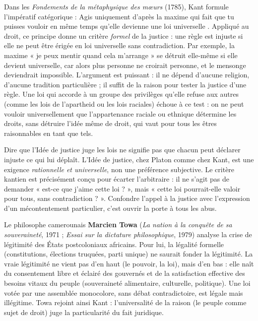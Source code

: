 \documentclass[11pt]{article}
\begin{document}
\begin{propriete}
Dans les \emph{Fondements de la métaphysique des mœurs} (1785), Kant formule l'impératif catégorique : \guillemotleft Agis uniquement d'après la maxime qui fait que tu puisses vouloir en même temps qu'elle devienne une loi universelle \guillemotright. Appliqué au droit, ce principe donne un critère \emph{formel} de la justice : une règle est injuste si elle ne peut être érigée en loi universelle sans contradiction. Par exemple, la maxime « je peux mentir quand cela m'arrange » se détruit elle-même si elle devient universelle, car alors plus personne ne croirait personne, et le mensonge deviendrait impossible. L'argument est puissant : il ne dépend d'aucune religion, d'aucune tradition particulière ; il suffit de la raison pour tester la justice d'une règle. Une loi qui accorde à un groupe des privilèges qu'elle refuse aux autres (comme les lois de l'apartheid ou les lois raciales) échoue à ce test : on ne peut vouloir universellement que l'appartenance raciale ou ethnique détermine les droits, sans détruire l'idée même de droit, qui vaut pour tous les êtres raisonnables en tant que tels.
\end{propriete}

\begin{attention}
Dire que l'Idée de justice juge les lois ne signifie pas que chacun peut déclarer injuste ce qui lui déplaît. L'Idée de justice, chez Platon comme chez Kant, est une exigence \emph{rationnelle et universelle}, non une préférence subjective. Le critère kantien est précisément conçu pour écarter l'arbitraire : il ne s'agit pas de demander « est-ce que j'aime cette loi ? », mais « cette loi pourrait-elle valoir pour tous, sans contradiction ? ». Confondre l'appel à la justice avec l'expression d'un mécontentement particulier, c'est ouvrir la porte à tous les abus.
\end{attention}

\begin{savaistu}
Le philosophe camerounais \textbf{Marcien Towa} (\emph{La nation à la conquête de sa souveraineté}, 1971 ; \emph{Essai sur la dictature philosophique}, 1979) analyse la crise de légitimité des États postcoloniaux africains. Pour lui, la légalité formelle (constitutions, élections truquées, parti unique) ne saurait fonder la légitimité. La vraie légitimité ne vient pas d'en haut (le pouvoir, la loi), mais d'en bas : elle naît du \guillemotleft consentement libre et éclairé \guillemotright des gouvernés et de la satisfaction effective des besoins vitaux du peuple (souveraineté alimentaire, culturelle, politique). Une loi votée par une assemblée monocolore, sans débat contradictoire, est légale mais illégitime. Towa rejoint ainsi Kant : l'universalité de la raison (le peuple comme sujet de droit) juge la particularité du fait juridique.
\end{savaistu}
\end{document}
